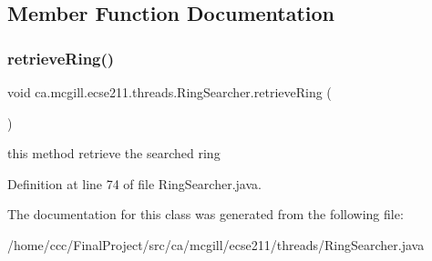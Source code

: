 \subsection{Member Function Documentation}
\mbox{\label{classca_1_1mcgill_1_1ecse211_1_1threads_1_1_ring_searcher_abd7a2651a7c5de76a018664c8bf327af}} 
\subsubsection{\texorpdfstring{retrieve\+Ring()}{retrieveRing()}}
{\footnotesize\ttfamily void ca.\+mcgill.\+ecse211.\+threads.\+Ring\+Searcher.\+retrieve\+Ring (\begin{DoxyParamCaption}{ }\end{DoxyParamCaption})}

this method retrieve the searched ring 

Definition at line 74 of file Ring\+Searcher.\+java.



The documentation for this class was generated from the following file\+:\begin{DoxyCompactItemize}
\item 
/home/ccc/\+Final\+Project/src/ca/mcgill/ecse211/threads/Ring\+Searcher.\+java\end{DoxyCompactItemize}
